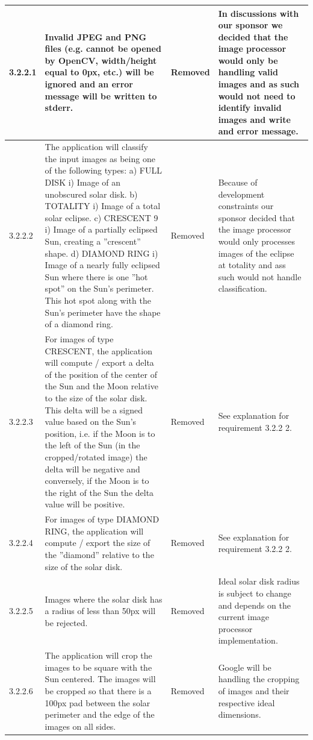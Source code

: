 \documentclass[10pt, onecolumn, draftclsnofoot, letterpaper, compsoc]{IEEEtran}
\begin{document}
\begin{longtable}{| p{} | p{} | p{} | p{} |}
    3.2.2.1 &
    Invalid JPEG and PNG files (e.g. cannot be opened by OpenCV, width/height equal to 0px, etc.) will be
    ignored and an error message will be written to stderr. &
    Removed &
    In discussions with our sponsor we decided that the image processor would only be handling valid images and
    as such would not need to identify invalid images and write and error message.
    \\ \hline

    3.2.2.2 &
    The application will classify the input images as being one of the following types:
    a) FULL DISK
    i) Image of an unobscured solar disk.
    b) TOTALITY
    i) Image of a total solar eclipse.
    c) CRESCENT
    9
    i) Image of a partially eclipsed Sun, creating a ”crescent” shape.
    d) DIAMOND RING
    i) Image of a nearly fully eclipsed Sun where there is one ”hot spot” on the Sun’s perimeter. This hot
    spot along with the Sun’s perimeter have the shape of a diamond ring. &
    Removed &
    Because of development constraints our sponsor decided that the image processor would only processes
    images of the eclipse at totality and ass such would not handle classification.
    \\ \hline

    3.2.2.3 &
    For images of type CRESCENT, the application will compute / export a delta of the position of the center
    of the Sun and the Moon relative to the size of the solar disk. This delta will be a signed value based on
    the Sun’s position, i.e. if the Moon is to the left of the Sun (in the cropped/rotated image) the delta will be
    negative and conversely, if the Moon is to the right of the Sun the delta value will be positive. &
    Removed &
    See explanation for requirement 3.2.2 2.
    \\ \hline

    3.2.2.4 &
    For images of type DIAMOND RING, the application will compute / export the size of the ”diamond”
    relative to the size of the solar disk. &
    Removed &
    See explanation for requirement 3.2.2 2.
    \\ \hline

    3.2.2.5 &
	Images where the solar disk has a radius of less than 50px will be rejected. &
	Removed &
	Ideal solar disk radius is subject to change and depends on the current
    image processor implementation.
	\\ \hline

    3.2.2.6 &
	The application will crop the images to be square with the Sun centered.
    The images will be cropped so that there is a 100px pad between the solar
    perimeter and the edge of the images on all sides. &
	Removed &
	Google will be handling the cropping of images and their respective ideal
    dimensions.
	\\ \hline


\end{longtable}
\end{document}
